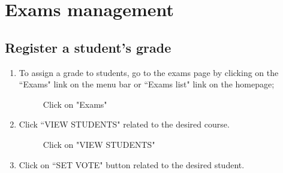 \documentclass[ManualeUtente]{subfiles}
\begin{document}
\section{Exams management}
\subsection{Register a student's grade}
\begin{enumerate}
	\item To assign a grade to students, go to the exams page by clicking on the \textquotedblleft Exams" link on the menu bar or \textquotedblleft Exams list" link on the homepage;
	\begin{figure}[H]
		\centering
		\caption{Click on "Exams"}
		\label{fig:Click on "Exams"}
	\end{figure}
	\item Click \textquotedblleft VIEW STUDENTS" related to the desired course.
	\begin{figure}[H]
		\centering
		\caption{Click on "VIEW STUDENTS"}
		\label{fig:Click on "VIEW STUDENTS"}
	\end{figure} \newpage
	\item Click on \textquotedblleft SET VOTE" button related to the desired student.
	\begin{figure}[H]
		\centering

\end{figure}
\end{enumerate}
\end{document}
